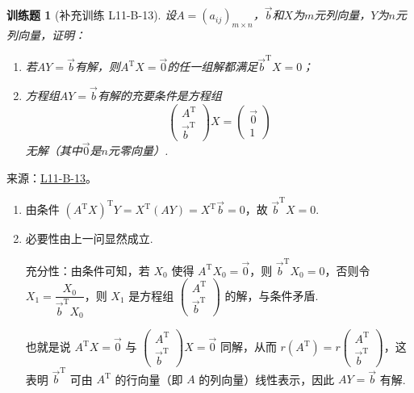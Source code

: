 \documentclass[12pt,fontset=fandol]{ctexart}
\newtheorem{exercise}{训练题}[section]
\begin{document}
\begin{exercise}[补充训练 L11-B-13]\label{prob:L11-B-13}
设$A=(a_{ij})_{m\times n}$，$\vec{b}$和$X$为$m$元列向量，$Y$为$n$元列向量，证明：
        \begin{enumerate}
            \item 若$AY=\vec{b}$有解，则$A^\mathrm{T}X=\vec{0}$的任一组解都满足$\vec{b}^\mathrm{T}X=0$；

            \item 方程组$AY=\vec{b}$有解的充要条件是方程组
\[\begin{pmatrix}
                          A^\mathrm{T} \\ \vec{b}^\mathrm{T}
                      \end{pmatrix}X=\begin{pmatrix}
                          \vec{0} \\ 1
                      \end{pmatrix}\]
无解（其中$\vec{0}$是$n$元零向量）.
        \end{enumerate}
\end{exercise}
\noindent 来源：\href{https://github.com/yhwu-is/Linear-Algebra-Left-Undone/blob/new/%E8%AE%B2%E4%B9%89/%E4%B8%93%E9%A2%98/11%20%E6%9C%9D%E8%8A%B1%E5%A4%95%E6%8B%BE.tex}{L11-B-13}。
\begin{solve}
\begin{enumerate}
                \item 由条件 $(A^\mathrm{T}X)^\mathrm{T}Y=X^\mathrm{T}(AY)=X^\mathrm{T}\vec{b}=0$，故 $\vec{b}^\mathrm{T}X=0$.
                \item 必要性由上一问显然成立.

                充分性：由条件可知，若 $X_0$ 使得 $A^\mathrm{T}X_0=\vec{0}$，则 $\vec{b}^\mathrm{T}X_0=0$，否则令 $X_1 =\dfrac{X_0}{\vec{b}^\mathrm{T}X_0}$，则 $X_1$ 是方程组 $\begin{pmatrix} A^\mathrm{T} \\ \vec{b}^\mathrm{T} \end{pmatrix}$ 的解，与条件矛盾.

                也就是说 $A^\mathrm{T}X=\vec{0}$ 与 $\begin{pmatrix} A^\mathrm{T} \\ \vec{b}^\mathrm{T} \end{pmatrix} X = \vec{0}$ 同解，从而 $r(A^\mathrm{T}) = r\begin{pmatrix} A^\mathrm{T} \\ \vec{b}^\mathrm{T} \end{pmatrix}$，这表明 $\vec{b}^\mathrm{T}$ 可由 $A^\mathrm{T}$ 的行向量（即 $A$ 的列向量）线性表示，因此 $AY=\vec{b}$ 有解.
            \end{enumerate}
\end{solve}
\end{document}
